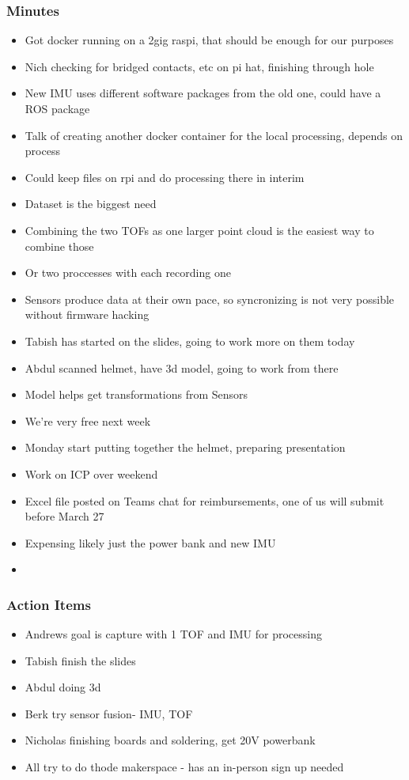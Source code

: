		\subsubsection*{Minutes}
			\begin{itemize}
				\item Got docker running on a 2gig raspi, that should be enough for our purposes
				\item Nich checking for bridged contacts, etc on pi hat, finishing through hole 
				\item New IMU uses different software packages from the old one, could have a ROS package
				\item Talk of creating another docker container for the local processing, depends on process 
				\item Could keep files on rpi and do processing there in interim 
				\item Dataset is the biggest need
				\item Combining the two TOFs as one larger point cloud is the easiest way to combine those
				\item Or two proccesses with each recording one
				\item Sensors produce data at their own pace, so syncronizing is not very possible without firmware hacking
				\item Tabish has started on the slides, going to work more on them today
				\item Abdul scanned helmet, have 3d model, going to work from there
				\item Model helps get transformations from Sensors
				\item We're very free next week
				\item Monday start putting together the helmet, preparing presentation
				\item Work on ICP over weekend
				\item Excel file posted on Teams chat for reimbursements, one of us will submit before March 27
				\item Expensing likely just the power bank and new IMU
				\item 
			\end{itemize}

		\subsubsection*{Action Items}
			\begin{itemize}
				\item Andrews goal is capture with 1 TOF and IMU for processing
				\item Tabish finish the slides
				\item Abdul doing 3d 
				\item Berk try sensor fusion- IMU, TOF
				\item Nicholas finishing boards and soldering, get 20V powerbank
				\item All try to do thode makerspace - has an in-person sign up needed
			\end{itemize}


